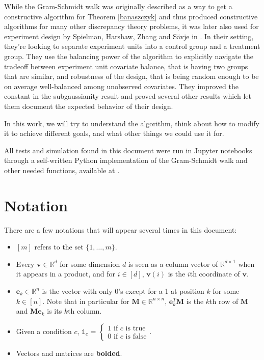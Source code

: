 \documentclass[12pt]{article}
\begin{document}
While the Gram-Schmidt walk was originally described as a way to get a constructive algorithm for Theorem \ref{banaszczyk} and thus produced constructive algorithms for many other discrepancy theory problems, it was later also used for experiment design by Spielman, Harshaw, Zhang and Sävje in \cite{harshaw2019balancing}. In their setting, they're looking to separate experiment units into a control group and a treatment group.  They use the balancing power of the algorithm to explicitly navigate the tradeoff between experiment unit covariate balance, that is having two groups that are similar, and robustness of the design, that is being random enough to be on average well-balanced among unobserved covariates. They improved the constant in the subgaussianity result and proved several other results which let them document the expected behavior of their design.

In this work, we will try to understand the algorithm, think about how to modify it to achieve different goals, and what other things we could use it for.

All tests and simulation found in this document were run in Jupyter notebooks through a self-written Python implementation of the Gram-Schmidt walk and other needed functions, available at \cite{github}.

\section{Notation}
There are a few notations that will appear several times in this document:
\begin{itemize}
\item $[m]$ refers to the set $\{1,\dots,m\}$.
\item Every $\textbf{v}\in\mathbb{R}^d$ for some dimension $d$ is seen as a column vector of $\mathbb{R}^{d\times 1}$ when it appears in a product, and for $i\in[d]$, $\textbf{v}(i)$ is the $i$th coordinate of $\textbf{v}$.
\item $\textbf{e}_k\in\mathbb{R}^{n}$ is the vector with only 0's except for a 1 at position $k$ for some $k\in[n]$. Note that in particular for $\textbf{M}\in\mathbb{R}^{n\times n}$, $\textbf{e}_k^T\textbf{M}$ is the $k$th row of $\textbf{M}$ and $\textbf{Me}_k$ is its $k$th column.
\item Given a condition $c$, $\mathds{1}_{c}$ = $\begin{cases}
            1 \textrm{ if }c\textrm{ is true}\\
            0 \textrm{ if }c\textrm{ is false}
        \end{cases}$.
\item Vectors and matrices are \textbf{bolded}.
\end{itemize}
\end{document}
